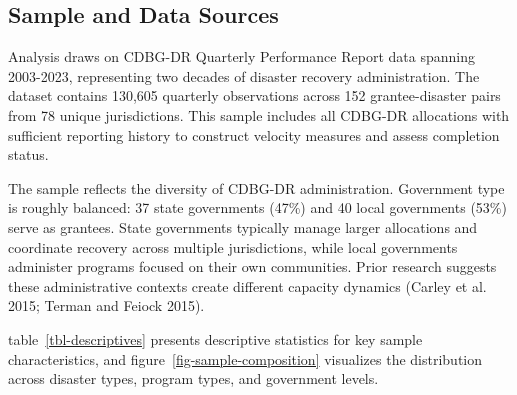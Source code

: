 \documentclass[
  12pt,
  letterpaper,
]{article}
\begin{document}
\subsection{Sample and Data Sources}\label{sample-and-data-sources}

Analysis draws on CDBG-DR Quarterly Performance Report data spanning
2003-2023, representing two decades of disaster recovery administration.
The dataset contains 130,605 quarterly observations across 152
grantee-disaster pairs from 78 unique jurisdictions. This sample
includes all CDBG-DR allocations with sufficient reporting history to
construct velocity measures and assess completion status.

The sample reflects the diversity of CDBG-DR administration. Government
type is roughly balanced: 37 state governments (47\%) and 40 local
governments (53\%) serve as grantees. State governments typically manage
larger allocations and coordinate recovery across multiple
jurisdictions, while local governments administer programs focused on
their own communities. Prior research suggests these administrative
contexts create different capacity dynamics (Carley et al. 2015; Terman
and Feiock 2015).

table~\ref{tbl-descriptives} presents descriptive statistics for key
sample characteristics, and figure~\ref{fig-sample-composition}
visualizes the distribution across disaster types, program types, and
government levels.
\end{document}
